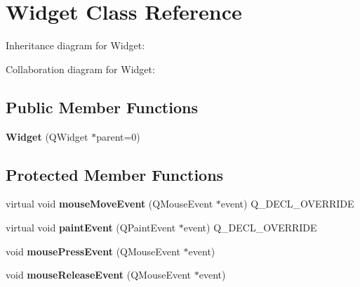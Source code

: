 \hypertarget{classWidget}{}\section{Widget Class Reference}
\label{classWidget}


Inheritance diagram for Widget\+:


Collaboration diagram for Widget\+:
\subsection*{Public Member Functions}
\begin{DoxyCompactItemize}
\item 
\mbox{\label{classWidget_a29531c7f141e461322981b3b579d4590}} 
{\bfseries Widget} (Q\+Widget $\ast$parent=0)
\end{DoxyCompactItemize}
\subsection*{Protected Member Functions}
\begin{DoxyCompactItemize}
\item 
\mbox{\label{classWidget_a642583ecbbf944eff8a6c11889760d4b}} 
virtual void {\bfseries mouse\+Move\+Event} (Q\+Mouse\+Event $\ast$event) Q\+\_\+\+D\+E\+C\+L\+\_\+\+O\+V\+E\+R\+R\+I\+DE
\item 
\mbox{\label{classWidget_a05bd48b73af4ed8ed98e0fec6bcc22f1}} 
virtual void {\bfseries paint\+Event} (Q\+Paint\+Event $\ast$event) Q\+\_\+\+D\+E\+C\+L\+\_\+\+O\+V\+E\+R\+R\+I\+DE
\item 
\mbox{\label{classWidget_a681594b94d8b48c7e7b669268f3baf81}} 
void {\bfseries mouse\+Press\+Event} (Q\+Mouse\+Event $\ast$event)
\item 
\mbox{\label{classWidget_a3ec430e3f6b8939baceed638d8f864cd}} 
void {\bfseries mouse\+Release\+Event} (Q\+Mouse\+Event $\ast$event)
\end{DoxyCompactItemize}
